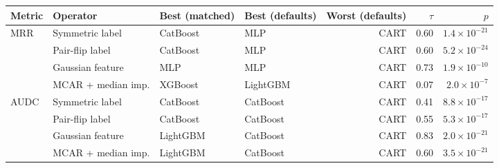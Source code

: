 \begin{table}[t]
\vspace{6pt}
\begin{tabular}{@{}llllrrr@{}}
\toprule
Metric & Operator & Best (matched) & Best (defaults) & Worst (defaults) & $\tau$ & $p$ \\
\midrule
MRR & Symmetric label & CatBoost & MLP & CART & 0.60 & $1.4\times10^{-21}$ \\
 & Pair-flip label & CatBoost & MLP & CART & 0.60 & $5.2\times10^{-24}$ \\
 & Gaussian feature & MLP & MLP & CART & 0.73 & $1.9\times10^{-10}$ \\
 & MCAR + median imp. & XGBoost & LightGBM & CART & 0.07 & $2.0\times10^{-7}$ \\
\midrule
AUDC & Symmetric label & CatBoost & CatBoost & CART & 0.41 & $8.8\times10^{-17}$ \\
 & Pair-flip label & CatBoost & CatBoost & CART & 0.55 & $5.3\times10^{-17}$ \\
 & Gaussian feature & LightGBM & CatBoost & CART & 0.83 & $2.0\times10^{-21}$ \\
 & MCAR + median imp. & LightGBM & CatBoost & CART & 0.60 & $3.5\times10^{-21}$ \\
\bottomrule
\end{tabular}
\end{table}
